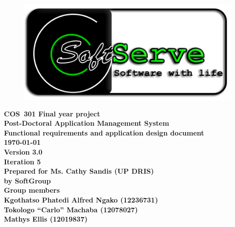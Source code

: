 \documentclass[12pt]{article}
\newcommand{\Title}{Functional requirements and application design document} %
\newcommand{\Class}{COS\ 301 Final year project} %
\newcommand{\ssr}{Soft\color{green}{Serve }\color{black}}
\newcommand{\version}{3.0}
\newcommand{\iteration}{5}
\newcommand{\client}{Ms. Cathy Sandis (UP DRIS)}
\newcommand{\project}{Post-Doctoral Application Management System}
\begin{document}
\vspace{4em}

\begin{center}%

\begin{figure}[ht!]
\centering
\includegraphics{../Images_Docs/logo.png}
\end{figure}
\LARGE \bf \Class \\[0.25em]
\LARGE \bf \project \\[1em]
\LARGE \bf \Title \\[0.25em]
\large \bf \today\\
\bf Version \version\\
\bf Iteration \iteration\\[0.5em]
\Large \bf Prepared for \client\\
\Large \bf by
\Large {\bf \ssr Group }\\[0.5em]
\LARGE {\bf Group members}\\[0.25em]
\large
Kgothatso Phatedi Alfred Ngako (12236731) \\[0.5em]
Tokologo “Carlo” Machaba (12078027) \\[0.5em]
Mathys Ellis (12019837) \\[8em]

\end{center}%

\end{document}
